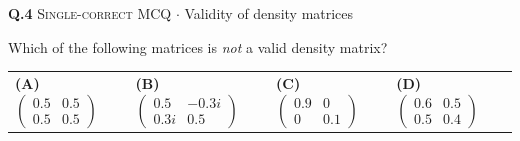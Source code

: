 \documentclass[11pt,a4paper]{article}
\newcommand{\optlabel}[1]{\textbf{(#1)}}
\newcommand{\correctlabel}[1]{\textcolor{okgreen}{\textbf{(#1)}\,\ding{51}}}
\newenvironment{qitem}[1]{\begin{list}{}{\setlength{\leftmargin}{3.3em}\setlength{\labelwidth}{3.1em}%
  \setlength{\labelsep}{0.2em}\setlength{\topsep}{3pt}\setlength{\parsep}{3pt}}\item[\textbf{Q.#1}\hfill]}{\end{list}}
\newcommand{\qmeta}[2]{{\footnotesize\color{black!60}\textsc{#1} \;$\cdot$\; #2}\par}
\begin{document}
\begin{qitem}{4}
\qmeta{Single-correct MCQ}{Validity of density matrices}
Which of the following matrices is \emph{not} a valid density matrix?
\par\smallskip\noindent\begin{tabularx}{\linewidth}{@{}*{4}{L}@{}}
\optlabel{A}\,$\begin{pmatrix}0.5 & 0.5\\ 0.5 & 0.5\end{pmatrix}$ & \optlabel{B}\,$\begin{pmatrix}0.5 & -0.3i\\ 0.3i & 0.5\end{pmatrix}$ & \optlabel{C}\,$\begin{pmatrix}0.9 & 0\\ 0 & 0.1\end{pmatrix}$ & \correctlabel{D}\,$\begin{pmatrix}0.6 & 0.5\\ 0.5 & 0.4\end{pmatrix}$
\end{tabularx}
\end{qitem}
\end{document}
